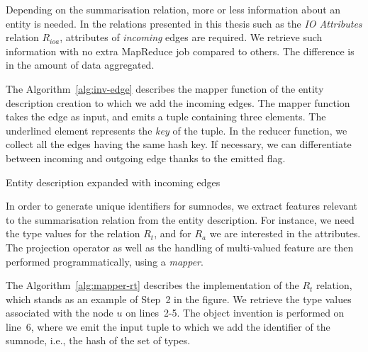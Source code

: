 Depending on the summarisation relation, more or less information about an entity is needed. In the relations presented in this thesis such as the \emph{IO Attributes} relation $R_{ioa}$, attributes of \emph{incoming} edges are required. We retrieve such information with no extra MapReduce job compared to others. The difference is in the amount of data aggregated.

The Algorithm~\ref{alg:inv-edge} describes the mapper function of the entity description creation to which we add the incoming edges. The mapper function takes the edge as input, and emits a tuple containing three elements. The underlined element represents the \emph{key} of the tuple. In the reducer function, we collect all the edges having the same hash key. If necessary, we can differentiate between incoming and outgoing edge thanks to the emitted flag.

\begin{algorithm}
	\DontPrintSemicolon
	\BlankLine
	\caption{Entity description expanded with incoming edges}
	\label{alg:inv-edge}
\end{algorithm}


In order to generate unique identifiers for sumnodes, we extract features relevant to the summarisation relation from the entity description. For instance, we need the type values for the relation $R_t$, and for $R_a$ we are interested in the attributes. The projection operator as well as the handling of multi-valued feature are then performed programmatically, using a \emph{mapper}.

The Algorithm~\ref{alg:mapper-rt} describes the implementation of the $R_t$ relation, which stands as an example of Step~2 in the figure. We retrieve the type values associated with the node $u$ on lines~2-5. The object invention is performed on line~6, where we emit the input tuple to which we add the identifier of the sumnode, i.e., the hash of the set of types.

